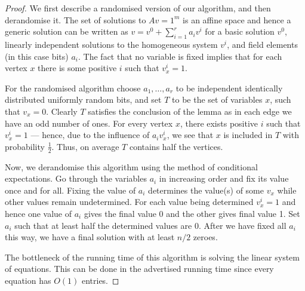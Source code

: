 \documentclass[10pt,a4paper]{article}
\theoremstyle{plain}
\theoremstyle{definition}
\begin{document}
\begin{proof}

    We first describe a randomised version of our algorithm, and then derandomise
    it. The set of solutions to $Av=1^m$ is an affine space and hence a generic solution can be written as $v=v^0+\sum_{i=1}^r a_i v^i$ for a basic solution $v^0$, linearly independent solutions to the homogeneous system $v^i$, and field elements (in this case bits) $a_i$.
    The fact that no variable is fixed implies that for each vertex $x$ there is 
    some positive $i$ such that $v^i_x=1$.
    
     For the randomised algorithm choose $a_1, \ldots, a_r$ to be independent identically distributed uniformly random bits, and set $T$ to be 
     the set of variables $x$, such that $v_x=0$.  Clearly $T$ satisfies
     the conclusion of the lemma as in each edge we have an odd number of ones. 
     For every vertex $x$, there exists positive $i$ such that $v_x^i = 1$ --- hence, due to the influence of $a_i v_x^i$, we see that $x$ is included in $T$ with probability $\frac{1}{2}$.
     Thus, on average $T$ contains half the vertices.

    Now, we derandomise this algorithm using the method of conditional
    expectations. Go through the variables $a_i$ in increasing order and 
    fix its value once and for all.  Fixing the value of $a_i$ determines
    the value(s) of some $v_x$ while other values remain undetermined.  For each
    value being determined $v_x^i=1$ and hence one value of $a_i$ gives
    the final value 0 and the other gives final value 1.  Set $a_i$ such
    that at least half the determined values are 0.  After we have 
    fixed all $a_i$ this way, we have a final solution with at least
    $n/2$ zeroes.
    
    The bottleneck of the running time of this algorithm is solving the linear system of equations. This can be done in the advertised running time since every equation has $O(1)$ entries. 
\end{proof}
\end{document}

